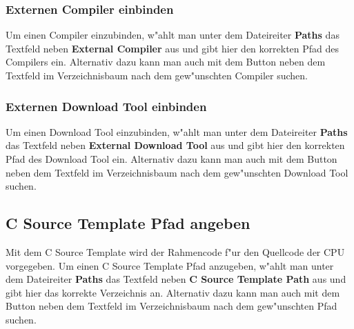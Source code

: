\documentclass[a4paper,titlepage,12pt,ngerman]{scrbook}
\begin{document}
\subsubsection{Externen Compiler einbinden}
Um einen Compiler einzubinden, w"ahlt man unter dem Dateireiter {\bf Paths} das Textfeld neben {\bf External Compiler} aus und gibt hier den korrekten Pfad des Compilers ein. Alternativ dazu kann man auch mit dem Button neben dem Textfeld im Verzeichnisbaum nach dem gew"unschten Compiler suchen.\par
\subsubsection{Externen Download Tool einbinden}
Um einen Download Tool einzubinden, w"ahlt man unter dem Dateireiter {\bf Paths} das Textfeld neben {\bf External Download Tool} aus und gibt hier den korrekten Pfad des Download Tool ein. Alternativ dazu kann man auch mit dem Button neben dem Textfeld im Verzeichnisbaum nach dem gew"unschten Download Tool suchen. \par



\newpage
\subsection{C Source Template Pfad angeben}
Mit dem C Source Template wird der Rahmencode f"ur den Quellcode der CPU vorgegeben.
Um einen C Source Template Pfad anzugeben, w"ahlt man unter dem Dateireiter {\bf Paths} das Textfeld neben {\bf C Source Template Path} aus und gibt hier das korrekte Verzeichnis an. Alternativ dazu kann man auch mit dem Button neben dem Textfeld im Verzeichnisbaum nach dem gew"unschten Pfad suchen. \par


\end{document}
